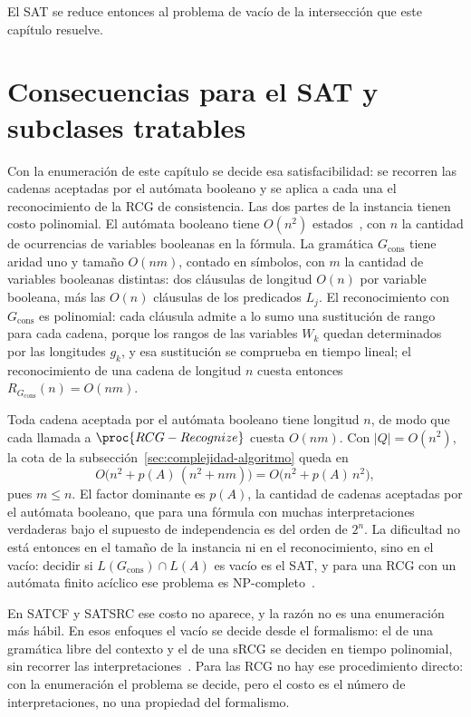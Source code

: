 \documentclass{report}
\theoremstyle{definition}
\theoremstyle{plain}
\theoremstyle{remark}
\begin{document}
El SAT se reduce entonces al problema de vacío de la intersección que
este capítulo resuelve.

\section{Consecuencias para el SAT y subclases tratables}
\label{sec:lectura-sat}

Con la enumeración de este capítulo se decide esa satisfacibilidad: se
recorren las cadenas aceptadas por el autómata booleano y se aplica a
cada una el reconocimiento de la RCG de consistencia. Las dos partes
de la instancia tienen costo polinomial. El autómata booleano tiene
$O(n^2)$ estados~\cite{fernandezarias2007}, con $n$ la cantidad de
ocurrencias de variables booleanas en la fórmula. La gramática
$G_{\mathrm{cons}}$ tiene aridad uno y tamaño $O(nm)$, contado en
símbolos, con $m$ la cantidad de variables booleanas distintas: dos
cláusulas de longitud $O(n)$ por variable booleana, más las $O(n)$
cláusulas de los predicados $L_j$. El reconocimiento con
$G_{\mathrm{cons}}$ es polinomial: cada cláusula admite a lo sumo una sustitución de rango
para cada cadena, porque los rangos de las variables $W_k$ quedan
determinados por las longitudes $g_k$, y esa sustitución se comprueba
en tiempo lineal; el reconocimiento de una cadena de longitud $n$
cuesta entonces $R_{G_{\mathrm{cons}}}(n) = O(nm)$.

Toda cadena aceptada por el autómata booleano tiene longitud $n$, de
modo que cada llamada a $\proc{RCG-Recognize}$ cuesta $O(nm)$. Con
$|Q| = O(n^2)$, la cota de la
subsección~\ref{sec:complejidad-algoritmo} queda en
\[
  O\bigl( n^2 + p(A)\,(n^2 + nm) \bigr) = O\bigl( n^2 + p(A)\,n^2 \bigr),
\]
pues $m \le n$. El factor dominante es $p(A)$, la cantidad de cadenas
aceptadas por el autómata booleano, que para una fórmula con muchas
interpretaciones verdaderas bajo el supuesto de independencia es del
orden de $2^n$. La dificultad no está entonces en el tamaño de la
instancia ni en el reconocimiento, sino en el vacío: decidir si
$L(G_{\mathrm{cons}}) \cap L(A)$ es vacío es el SAT, y para una RCG
con un autómata finito acíclico ese problema es
NP-completo~\cite{bertsch2001rcg}.

En SATCF y SATSRC ese costo no aparece, y la razón no es una enumeración
más hábil. En esos enfoques el vacío se decide desde el formalismo: el
de una gramática libre del contexto y el de una sRCG se deciden en
tiempo polinomial, sin recorrer las
interpretaciones~\cite{fernandezarias2007,aguileralopez2016}. Para las
RCG no hay ese procedimiento directo: con la enumeración el problema se
decide, pero el costo es el número de interpretaciones, no una propiedad
del formalismo.
\end{document}
